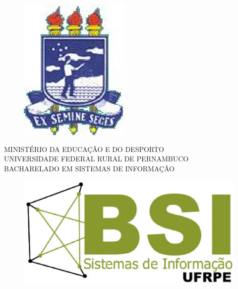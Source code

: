 \documentclass[a4paper,11pt]{article}
\begin{document}
\pagestyle {empty}

\vspace*{-2cm}
\begin{figure}[h]
\leavevmode
\begin{minipage}[t]{\textwidth}
\includegraphics[scale=0.7]{images/logo-ufrpe.eps}
\end{minipage}
\end{figure}
\vspace*{-3.0cm}
{\bf
\begin{center}
{
\hspace*{0cm} 	MINISTÉRIO DA EDUCAÇÃO E DO DESPORTO \\
\hspace*{.2in} UNIVERSIDADE FEDERAL RURAL DE PERNAMBUCO \\
\hspace*{.2in} BACHARELADO EM SISTEMAS DE INFORMAÇÃO} \\
\end{center}}
\vspace{0.0cm}
\noindent
\begin{figure}[h]
\centering
\includegraphics[scale=0.5]{images/Logo-bsi-presencial-v3-amp.eps}
\end{figure}
\vspace*{2.0cm}
\end{document}
